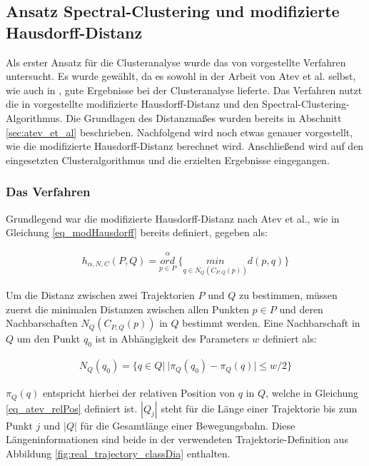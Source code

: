 \subsection[Spectral-Clustering und modifizierte Hausdorff-Distanz]{Ansatz Spectral-Clustering und modifizierte Hausdorff-Distanz}
\label{sec:real_ansatz_spec_modHD}

Als erster Ansatz für die Clusteranalyse wurde das von \cite[]{Atev2010} vorgestellte Verfahren untersucht.
Es wurde gewählt, da es sowohl in der Arbeit von Atev et al. selbst, wie auch in \cite[]{Morris2009}, gute Ergebnisse
bei der Clusteranalyse lieferte.
Das Verfahren nutzt die in \cite[]{Atev2006} vorgestellte modifizierte Hausdorff-Distanz und den
Spectral-Clustering-Algorithmus. Die Grundlagen des Distanzmaßes wurden bereits in Abschnitt
\ref{sec:atev_et_al} beschrieben. Nachfolgend wird noch etwas genauer vorgestellt, wie die
modifizierte Hausdorff-Distanz berechnet wird. Anschließend
wird auf den eingesetzten Clusteralgorithmus und die erzielten Ergebnisse eingegangen.

\subsubsection{Das Verfahren}

Grundlegend war die modifizierte Hausdorff-Distanz nach Atev et al., wie in Gleichung \ref{eq_modHausdorff}
bereits definiert, gegeben als:

\begin{ceqn}
\begin{align*}
    h_{\alpha, N, C}(P, Q) = \overset{\alpha}{\underset{p \in P}{ord}}\ \Big\{ \underset{q \in N_Q(C_{P,Q}(p))}{min} d(p, q) \Big\}
\end{align*}
\end{ceqn}

Um die Distanz zwischen zwei Trajektorien $P$ und $Q$ zu bestimmen, müssen zuerst die minimalen Distanzen
zwischen allen Punkten $p \in P$ und deren Nachbarschaften $N_Q(C_{P,Q}(p))$ in $Q$ bestimmt werden.
Eine Nachbarschaft in $Q$ um den Punkt $q_0$ ist in Abhängigkeit des Parameters $w$ definiert als:

\begin{ceqn}
\begin{align}
    N_Q(q_0) = \{ q \in Q |\ |\pi_Q(q_0) - \pi_Q(q)| \le w/2 \}
\end{align}
\end{ceqn}

$\pi_Q(q)$ entspricht hierbei der relativen Position von $q$ in $Q$, welche in Gleichung \ref{eq_atev_relPos} definiert ist.
$|Q_j|$ steht für die Länge einer Trajektorie bis zum Punkt $j$ und $|Q|$ für die Gesamtlänge einer Bewegungsbahn.
Diese Längeninformationen sind beide in der verwendeten Trajektorie-Definition aus Abbildung
\ref{fig:real_trajectory_classDia} enthalten.

